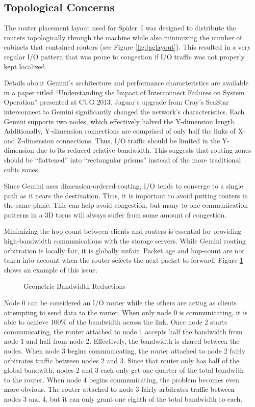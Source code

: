 \subsection{Topological Concerns}
\label{sec:topo}

The router placement layout used for Spider~I was designed to distribute the
routers topologically through the machine while also minimizing the number of
cabinets that contained routers (see Figure \ref{fig:jaglayout}). This resulted
in a very regular I/O pattern that was prone to congestion if I/O traffic was
not properly kept localized.

Details about Gemini's architecture and performance characteristics are
available in a paper titled ``Understanding the Impact of Interconnect Failures
on System Operation'' \cite{interconnect} presented at CUG 2013.  Jaguar's
upgrade from Cray's SeaStar interconnect to Gemini significantly changed the
network's characteristics.  Each Gemini supports two nodes, which effectively
halved the Y-dimension length.  Additionally, Y-dimension connections are
comprised of only half the links of X- and Z-dimension connections.  Thus, I/O
traffic should be limited in the Y-dimension due to its reduced relative
bandwidth.  This suggests that routing zones should be ``flattened'' into
``rectangular prisms'' instead of the more traditional cubic zones.

Since Gemini uses dimension-ordered-routing, I/O tends to converge to a single
path as it nears the destination.  Thus, it is important to avoid putting
routers in the same plane.  This can help avoid congestion, but many-to-one
communication patterns in a 3D torus will always suffer from some amount of
congestion.

Minimizing the hop count between clients and routers is essential for providing
high-bandwidth communications with the storage servers.  While Gemini routing
arbitration is locally fair, it is globally unfair.  Packet age and hop-count
are not taken into account when the router selects the next packet to forward.
Figure \ref{fig:geombw} shows an example of this issue.

\begin{figure}[h]
  \centering
  
  \caption{Geometric Bandwidth Reductions}\label{fig:geombw}
\end{figure}

Node 0 can be considered an I/O router while the others are acting as clients
attempting to send data to the router.  When only node 0 is communicating, it
is able to achieve 100\% of the bandwidth across the link.  Once node 2 starts
communicating, the router attached to node 1 accepts half the bandwidth from
node 1 and half from node 2.  Effectively, the bandwidth is shared between the
nodes.  When node 3 begins communicating, the router attached to node 2 fairly
arbitrates traffic between nodes 2 and 3.  Since that router only has half of
the global bandwith, nodes 2 and 3 each only get one quarter of the total
bandwith to the router.  When node 4 begins communicating, the problem becomes
even more obvious.  The router attached to node 3 fairly arbitrates traffic
between nodes 3 and 4, but it can only grant one eighth of the total bandwidth
to each.

